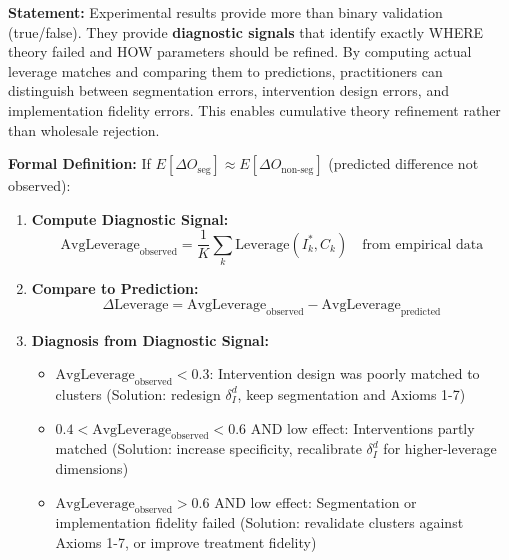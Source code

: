\vspace{1em}

\begin{tcolorbox}[colback=orange!5!white, colframe=orange!75!black,
    title=Axiom SEG-VAL-12: Diagnostic Refinement Principle]

\textbf{Statement:}
Experimental results provide more than binary validation (true/false). They provide \textbf{diagnostic signals} that
identify exactly WHERE theory failed and HOW parameters should be refined. By computing actual leverage matches
and comparing them to predictions, practitioners can distinguish between segmentation errors, intervention design
errors, and implementation fidelity errors. This enables cumulative theory refinement rather than wholesale rejection.
\cite{button2013power, bland1995multiple, camerer2018evaluatingevaluating}

\textbf{Formal Definition:}
If $E[\Delta O_{\text{seg}}] \approx E[\Delta O_{\text{non-seg}}]$ (predicted difference not observed):

\begin{enumerate}

\item \textbf{Compute Diagnostic Signal:}
\begin{equation}
\text{AvgLeverage}_{\text{observed}} = \frac{1}{K} \sum_k \text{Leverage}(I_k^*, C_k) \quad \text{from empirical data}
\end{equation}

\item \textbf{Compare to Prediction:}
\begin{equation}
\Delta \text{Leverage} = \text{AvgLeverage}_{\text{observed}} - \text{AvgLeverage}_{\text{predicted}}
\end{equation}

\item \textbf{Diagnosis from Diagnostic Signal:}
\begin{itemize}[nosep]
\item $\text{AvgLeverage}_{\text{observed}} < 0.3$: Intervention design was poorly matched to clusters
  (Solution: redesign $\delta_I^d$, keep segmentation and Axioms 1-7)
\item $0.4 < \text{AvgLeverage}_{\text{observed}} < 0.6$ AND low effect: Interventions partly matched
  (Solution: increase specificity, recalibrate $\delta_I^d$ for higher-leverage dimensions)
\item $\text{AvgLeverage}_{\text{observed}} > 0.6$ AND low effect: Segmentation or implementation fidelity failed
  (Solution: revalidate clusters against Axioms 1-7, or improve treatment fidelity)
\end{itemize}


\end{enumerate}
\end{tcolorbox}
